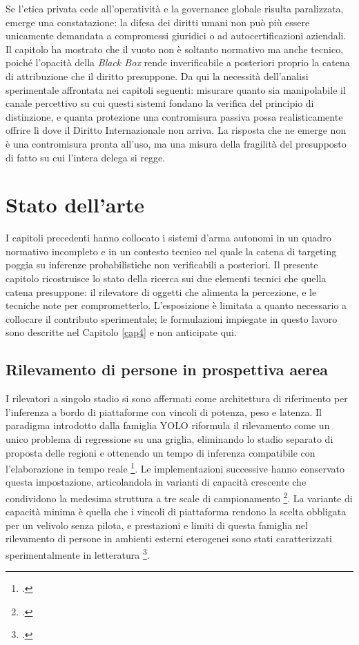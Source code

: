 \documentclass[a4paper,12pt]{report}
\begin{document}
Se l'etica privata cede all'operatività e la governance globale risulta
paralizzata, emerge una constatazione: la difesa dei diritti umani non può più
essere unicamente demandata a compromessi giuridici o ad autocertificazioni
aziendali. Il capitolo ha mostrato che il vuoto non è soltanto normativo ma anche
tecnico, poiché l'opacità della \textit{Black Box} rende inverificabile a
posteriori proprio la catena di attribuzione che il diritto presuppone. Da qui la
necessità dell'analisi sperimentale affrontata nei capitoli seguenti: misurare
quanto sia manipolabile il canale percettivo su cui questi sistemi fondano la
verifica del principio di distinzione, e quanta protezione una contromisura
passiva possa realisticamente offrire lì dove il Diritto Internazionale non
arriva. La risposta che ne emerge non è una contromisura pronta all'uso, ma una
misura della fragilità del presupposto di fatto su cui l'intera delega si regge.

\chapter{Stato dell'arte}
\label{cap3}

I capitoli precedenti hanno collocato i sistemi d'arma autonomi in un quadro
normativo incompleto e in un contesto tecnico nel quale la catena di targeting
poggia su inferenze probabilistiche non verificabili a posteriori. Il presente
capitolo ricostruisce lo stato della ricerca sui due elementi tecnici che quella
catena presuppone: il rilevatore di oggetti che alimenta la percezione, e le
tecniche note per comprometterlo. L'esposizione è limitata a quanto necessario a
collocare il contributo sperimentale; le formulazioni impiegate in questo lavoro
sono descritte nel Capitolo \ref{cap4} e non anticipate qui.

\section{Rilevamento di persone in prospettiva aerea}
\label{sec:sota_detection}

I rilevatori a singolo stadio si sono affermati come architettura di riferimento
per l'inferenza a bordo di piattaforme con vincoli di potenza, peso e latenza. Il
paradigma introdotto dalla famiglia YOLO riformula il rilevamento come un unico
problema di regressione su una griglia, eliminando lo stadio separato di
proposta delle regioni e ottenendo un tempo di inferenza compatibile con
l'elaborazione in tempo reale \footcite{redmon_2016_yolo}. Le implementazioni
successive hanno conservato questa impostazione, articolandola in varianti di
capacità crescente che condividono la medesima struttura a tre scale di
campionamento \footcite{jocher_2023_yolov8}. La variante di capacità minima è
quella che i vincoli di piattaforma rendono la scelta obbligata per un velivolo
senza pilota, e prestazioni e limiti di questa famiglia nel rilevamento di
persone in ambienti esterni eterogenei sono stati caratterizzati sperimentalmente
in letteratura \footcite{sodhro_2025}.
\end{document}

